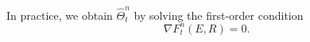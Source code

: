 \documentclass[ecta,nameyear,draft]{econsocart}
\def\wt{\widetilde}
\def\wh{\widehat}
\newcommand{\1}{\mathbf 1}
\newcommand{\calW}{\mathcal{W}}
\numberwithin{equation}{section}
\begin{document}
In practice,  we obtain $\wh\Theta^n_t$ by solving the first-order condition 
\begin{equation} 
	    \nabla F^n_t(E,R) = 0.
\end{equation}
\end{document}
